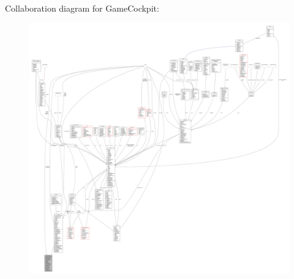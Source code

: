 Collaboration diagram for Game\+Cockpit\+:
\nopagebreak
\begin{figure}[H]
\begin{center}
\leavevmode
\includegraphics[width=350pt]{d9/d7b/classGameCockpit__coll__graph}
\end{center}
\end{figure}
